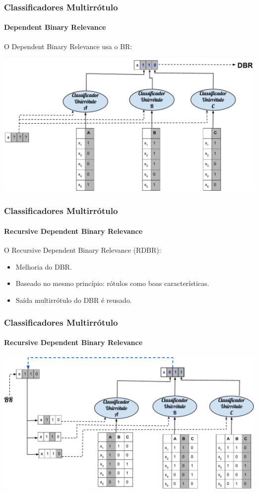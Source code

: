 \documentclass[10pt,fleqn]{beamer}
\begin{document}
\begin{frame}
  \frametitle{Classificadores Multirrótulo}
  \framesubtitle{Dependent Binary Relevance}
  O Dependent Binary Relevance usa o BR:
  
    \begin{center}
  \includegraphics[scale=0.4]{DBR-prediction-fig}
    \end{center}
\end{frame}


\begin{frame}
  \frametitle{Classificadores Multirrótulo}
  \framesubtitle{Recursive Dependent Binary Relevance}
  O Recursive Dependent Binary Relevance (RDBR):
   \begin{itemize}
    \item Melhoria do DBR.
    \item Baseado no mesmo princípio: rótulos como boas características.
    \item Saída multirrótulo do DBR é reusado.
   \end{itemize}

\end{frame}

\begin{frame}
  \frametitle{Classificadores Multirrótulo}
  \framesubtitle{Recursive Dependent Binary Relevance}
    \begin{center}
  \includegraphics[scale=0.4]{RDBR-fig}
    \end{center}
\end{frame}
\end{document}
